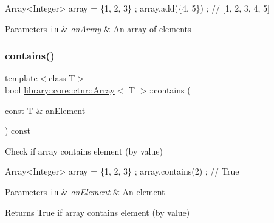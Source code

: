 \begin{DoxyCode}
Array<Integer> array = \{1, 2, 3\} ;
array.add(\{4, 5\}) ; \textcolor{comment}{// [1, 2, 3, 4, 5]}
\end{DoxyCode}



\begin{DoxyParams}[1]{Parameters}
\mbox{\tt in}  & {\em an\+Array} & An array of elements \\
\hline
\end{DoxyParams}
\mbox{\label{classlibrary_1_1core_1_1ctnr_1_1_array_a9c423eb8a34dddc81e0ede9435094e99}} 
\subsubsection{\texorpdfstring{contains()}{contains()}}
{\footnotesize\ttfamily template$<$class T$>$ \\
bool \hyperlink{classlibrary_1_1core_1_1ctnr_1_1_array}{library\+::core\+::ctnr\+::\+Array}$<$ T $>$\+::contains (\begin{DoxyParamCaption}\item[{const T \&}]{an\+Element }\end{DoxyParamCaption}) const}



Check if array contains element (by value) 


\begin{DoxyCode}
Array<Integer> array = \{1, 2, 3\} ;
array.contains(2) ; \textcolor{comment}{// True}
\end{DoxyCode}



\begin{DoxyParams}[1]{Parameters}
\mbox{\tt in}  & {\em an\+Element} & An element \\
\hline
\end{DoxyParams}
\begin{DoxyReturn}{Returns}
True if array contains element (by value) 
\end{DoxyReturn}
\mbox{\label{classlibrary_1_1core_1_1ctnr_1_1_array_a7795ee997ae6008cd0bc8db607315524}} 
